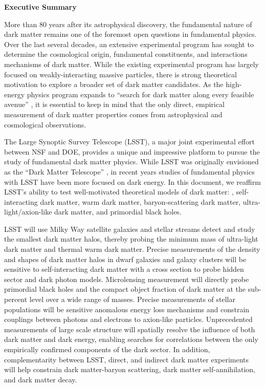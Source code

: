 \begin{center}
  {\Large \bf Executive Summary}
\end{center}

More than 80 years after its astrophysical discovery, the fundamental nature of dark matter remains one of the foremost open questions in fundamental physics.
Over the last several decades, an extensive experimental program has sought to determine the cosmological origin, fundamental constituents, and interactions mechanisms of dark matter. 
While the existing experimental program has largely focused on weakly-interacting massive particles, there is strong theoretical motivation to explore a broader set of dark matter candidates.
As the high-energy physics program expands to ``search for dark matter along every feasible avenue'' \citep{P5:2014}, it is essential to keep in mind that the only direct, empirical measurement of dark matter properties comes from astrophysical and cosmological observations.

The Large Synoptic Survey Telescope (LSST), a major joint experimental effort between NSF and DOE, provides a unique and impressive platform to pursue the study of fundamental dark matter physics.
While LSST was originally envisioned as the ``Dark Matter Telescope'' \citep{Tyson:2001}, in recent years studies of fundamental physics with LSST have been more focused on dark energy.
In this document, we reaffirm LSST's ability to test well-motivated theoretical models of dark matter: \ie, self-interacting dark matter, warm dark matter, baryon-scattering dark matter, ultra-light/axion-like dark matter, and primordial black holes. 

LSST will use Milky Way satellite galaxies and stellar streams detect and study the smallest dark matter halos, thereby probing the minimum mass of ultra-light dark matter and thermal warm dark matter.
Precise measurements of the density and shapes of dark matter halos in dwarf galaxies and galaxy clusters will be sensitive to self-interacting dark matter with a cross section to probe hidden sector and dark photon models.
Microlensing measurement will directly probe primordial black holes and the compact object fraction of dark matter at the sub-percent level over a wide range of masses.
Precise measurements of stellar populations will be sensitive anomalous energy loss mechanisms and constrain couplings between photons and electrons to axion-like particles.
Unprecedented measurements of large scale structure will spatially resolve the influence of both dark matter and dark energy, enabling searches for correlations between the only empirically confirmed components of the dark sector.
In addition, complementarity between LSST, direct, and indirect dark matter experiments will help constrain dark matter-baryon scattering, dark matter self-annihilation, and dark matter decay.

